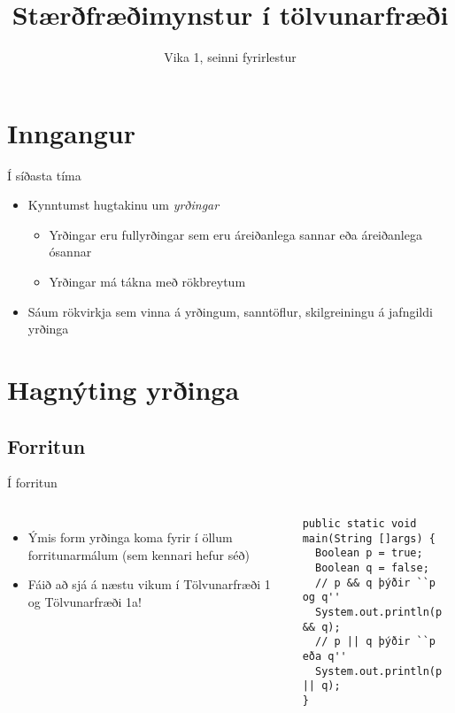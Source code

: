 \documentclass{beamer}
\title{Stærðfræðimynstur í tölvunarfræði}
\subtitle{Vika 1, seinni fyrirlestur}
\begin{document}
\begin{frame}
\titlepage
\end{frame}

\section{Inngangur}

\begin{frame}{Í síðasta tíma}
\begin{itemize}
 \item Kynntumst hugtakinu um \emph{yrðingar}
 \begin{itemize}
  \item Yrðingar eru fullyrðingar sem eru áreiðanlega sannar eða áreiðanlega ósannar
  \item Yrðingar má tákna með rökbreytum
 \end{itemize}
 \item Sáum rökvirkja sem vinna á yrðingum, sanntöflur, skilgreiningu á jafngildi yrðinga
\end{itemize}
\end{frame}

\section{Hagnýting yrðinga}

\subsection{Forritun}

\begin{frame}[fragile]{Í forritun}
\begin{columns}
\begin{itemize}
 \item Ýmis form yrðinga koma fyrir í öllum forritunarmálum (sem kennari hefur séð)
 \item Fáið að sjá á næstu vikum í Tölvunarfræði 1 og Tölvunarfræði 1a!
\end{itemize}
\begin{verbatim}
public static void main(String []args) {
  Boolean p = true;
  Boolean q = false;
  // p && q þýðir ``p og q''
  System.out.println(p && q);
  // p || q þýðir ``p eða q''
  System.out.println(p || q);
}
\end{verbatim}

\end{columns}
\end{frame}
\end{document}

